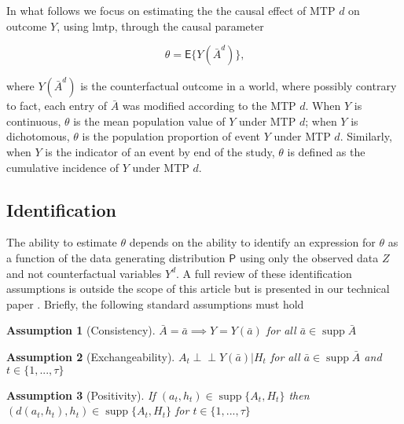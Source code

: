 \documentclass[twoside,11pt]{article}
\newcommand{\pkg}[1]{{\fontseries{b}\selectfont #1}}
\newcommand{\E}{\mathsf{E}}
\newcommand{\Prob}{\mathsf{P}}
\begin{document}
In what follows we focus on estimating the the causal effect of MTP $d$ on outcome $Y$, using \pkg{lmtp}, through the causal parameter

\begin{equation}
  \theta = \E\{Y(\bar A^d)\}\text{,}
\end{equation}

where $Y(\bar A^d)$ is the counterfactual outcome in a world, where possibly contrary to fact, each entry of $\bar{A}$ was modified according to the MTP $d$. When $Y$ is continuous, $\theta$ is the mean population value of $Y$ under MTP $d$; when $Y$ is dichotomous, $\theta$ is the population proportion of event $Y$ under MTP $d$. Similarly, when $Y$ is the indicator of an event by end of the study, $\theta$ is defined as the cumulative incidence of $Y$ under MTP $d$.

\hypertarget{identification}{\subsection{Identification}\label{identification}}

The ability to estimate $\theta$ depends on the ability to identify an expression for $\theta$ as a function of the data generating distribution $\Prob$ using only the observed data $Z$ and not counterfactual variables $Y^d$. A full review of these identification assumptions is outside the scope of this article but is presented in our technical paper \citep{jasaLMTP}. Briefly, the following standard assumptions must hold

\newtheorem{assumption}{Assumption}

\begin{assumption}[Consistency]\label{ass:cons}
$\bar{A} = \bar{a} \implies Y = Y(\bar{a})$ for all $\bar{a} \in \mathop{\mathrm{supp}}\bar{A}$ 
\end{assumption}
\begin{assumption}[Exchangeability]\label{ass:ex}
  $A_t \perp \!\!\! \perp Y(\bar{a}) | H_t$ for all
  $\bar{a} \in \mathop{\mathrm{supp}}\bar{A}$ and
  $t \in \{1, ..., \tau\}$
\end{assumption}
\begin{assumption}[Positivity]\label{ass:pos}
  If $(a_t, h_t) \in \mathop{\mathrm{supp}}\{A_t, H_t\}$ then
  $(d(a_t, h_t), h_t) \in \mathop{\mathrm{supp}}\{A_t, H_t\}$ for
  $t \in \{1, ..., \tau \}$
\end{assumption}
\end{document}
